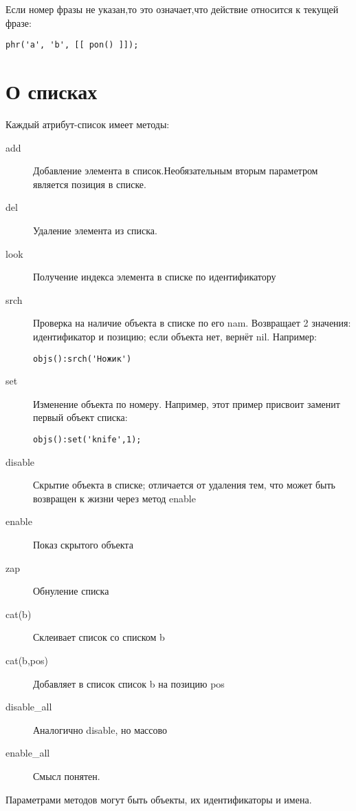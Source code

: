 \documentclass[a4paper,12pt]{article}
\begin{document}
Если номер фразы не указан,то это означает,что действие относится к текущей фразе:

\begin{verbatim}
phr('a', 'b', [[ pon() ]]);
\end{verbatim}

\section{О списках}

Каждый атрибут-список имеет методы:

\begin{description}
\item[add] Добавление элемента в список.Необязательным вторым параметром является позиция в списке.
\item[del] Удаление элемента из списка.
\item[look] Получение индекса элемента в списке по идентификатору
\item[srch] Проверка на наличие объекта в списке по его nam. Возвращает 2 значения: идентификатор и позицию; если объекта нет, вернёт nil. Например: \begin{verbatim}objs():srch('Ножик')\end{verbatim}
\item[set] Изменение объекта по номеру. Например, этот пример присвоит заменит первый объект списка: \begin{verbatim}objs():set('knife',1);\end{verbatim}
\item[disable] Скрытие объекта в списке; отличается от удаления тем, что может быть возвращен к жизни через метод enable
\item[enable] Показ скрытого объекта
\item[zap] Обнуление списка
\item[cat(b)] Склеивает список со списком b
\item[cat(b,pos)] Добавляет в список список b на позицию pos
\item[disable\_all] Аналогично disable, но массово
\item[enable\_all] Смысл понятен.
\end{description}

Параметрами методов могут быть объекты, их идентификаторы и имена.
\end{document}
